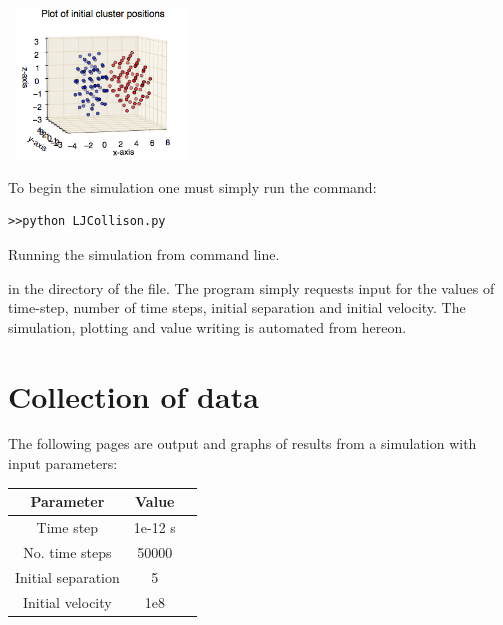 \documentclass{article}
\begin{document}
\begin{multicols}{2}
\begin{center}
	
\renewcommand{\lstlistingname}{Figure}
	\includegraphics[width = 5cm,height=4cm]{init_cluster_pos} 
\end{center}

To begin the simulation one must simply run the command:

\captionsetup[lstlisting]{position=bottom,font=footnotesize}
\renewcommand{\lstlistingname}{Code}
\begin{lstlisting}
>>python LJCollison.py
\end{lstlisting}
\setlength{\abovecaptionskip}{0pt plus 3pt minus 2pt}

\caption{Running the simulation from command line.}

in the directory of the file. The program simply requests input for the values of time-step, number of time steps, initial separation and initial velocity. The simulation, plotting and value writing is automated from hereon.

\onecolumn
\part{Collection of data}

The following pages are output and graphs of results from a simulation with input parameters:

\begin{center}
\begin{tabular}{ |c|c|c| } 
\hline
Parameter & Value \\
\hline
Time step & 1e-12 s\\ 
No. time steps & 50000 \\ 
Initial separation & 5\\ 
Initial velocity & 1e8\\
\hline
\end{tabular}
\end{center}
\end{multicols}
\end{document}
